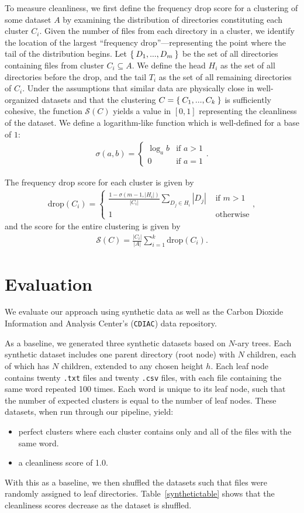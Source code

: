 \documentclass[sigconf,screen]{acmart}
\newcommand{\sub}{\subseteq}                                    %
\newcommand{\bee}{\begin{equation}\begin{aligned}}              %
\newcommand{\eee}{\end{aligned}\end{equation}}                  %
\newcommand{\fracc}{\frac}                                      %
\begin{document}
To measure cleanliness, we first define the frequency drop score for a clustering of some dataset $A$ by examining the distribution of directories constituting each cluster $C_i$. Given the number of files from each directory in a cluster, we identify the location of the largest ``frequency drop''---representing the point where the tail of the distribution begins. Let $\Set{D_1,...,D_m}$ be the set of all directories containing files from cluster $C_i \sub A$. We define the head $H_i$ as the set of all directories before the drop, and the tail $T_i$ as the set of all remaining directories of $C_i$. Under the assumptions that similar data are physically close in well-organized datasets and that the clustering $C = \Set{C_1,...,C_k}$ is sufficiently cohesive, the function $\mathcal{S}(C)$ yields a value in $[0,1]$ representing the cleanliness of the dataset. 
We define a logarithm-like function which is well-defined for a base of $1$:
\bee
\sigma(a,b) = 
\begin{cases}
\log_ab & \text{if }a > 1\\
0 & \text{if }a = 1
\end{cases}.
\eee

\noindent
The frequency drop score for each cluster is given by
\bee
\mathrm{drop}(C_i) = 
\begin{cases}
\fracc{1 - \sigma(m - 1, |H_i|)}{|C_i|}\sum\limits_{D_j \in H_i}|D_j| & \text{ if }m > 1\\
1 & \text{ otherwise}
\end{cases}, 
\eee
and the score for the entire clustering is given by
\bee
\mathcal{S}(C) = \fracc{|C_i|}{|A|}\sum_{i = 1}^k \mathrm{drop}(C_i). 
\eee


\section{Evaluation}
We evaluate our approach using synthetic data as well as the Carbon Dioxide Information and Analysis Center's (\texttt{CDIAC}) data repository. 

As a baseline, we generated three synthetic datasets based on $N$-ary trees. Each synthetic dataset includes one parent directory (root node) with $N$ children, each of which has $N$ children, extended to any chosen height $h$. Each leaf node contains twenty \texttt{.txt} files and twenty \texttt{.csv} files, with each file containing the same word repeated 100 times. Each word is unique to its leaf node, such that the number of expected clusters is equal to the number of leaf nodes. These datasets, when run through our pipeline, yield:
\begin{itemize}
    \item perfect clusters where each cluster contains only and all of the files with the same word.
    \item a cleanliness score of 1.0.
\end{itemize} 
With this as a baseline, we then shuffled the datasets such that files were randomly assigned to leaf directories. Table~\ref{synthetictable} shows that the cleanliness scores decrease as the dataset is shuffled.
\end{document}
